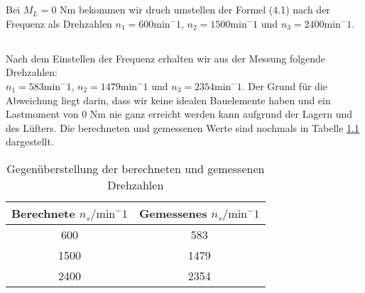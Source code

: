 \chapter{}\label{ex:aufg5}
%
\section{}\label{sec:aufg5a}
%
Bei $M_L = 0$ Nm bekommen wir druch umstellen der Formel (4.1) nach der Frequenz als Drehzahlen $n_1 = 600 \text{min}^-1$, $n_2 = 1500 \text{min}^-1$ und $n_3 = 2400 \text{min}^-1$.
\section{}\label{sec:aufg5b}
%
Nach dem Einstellen der Frequenz erhalten wir aus der Messung folgende Drehzahlen:\\
$n_1 = 583 \text{min}^-1$, $n_2 = 1479 \text{min}^-1$ und $n_3 = 2354 \text{min}^-1$.
Der Grund für die Abweichung liegt darin, dass wir keine idealen Bauelemente haben und ein Lastmoment von 0 Nm nie ganz erreicht werden kann aufgrund der Lagern und des Lüfters. Die berechneten und gemessenen Werte sind nochmals in Tabelle \ref{tab:drehzahlen} dargestellt.
\begin{table}[htb]
	\centering
	\begin{tabular}{c | c}
		Berechnete $n_s/\text{min}^-1$ & Gemessenes $n_s/\text{min}^-1$\\\hline
		600 &  583 \\ 
		1500 & 1479 \\ 
		2400 & 2354
	\end{tabular} 
	\caption{Gegenüberstellung der berechneten und gemessenen Drehzahlen}
	\label{tab:drehzahlen}
\end{table}
	
	
